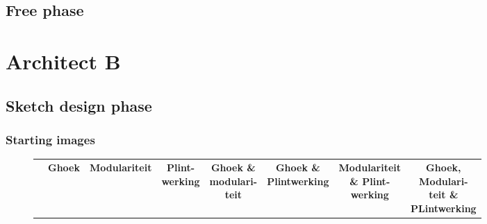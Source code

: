 \subsection{Free phase}

\section{Architect B}
\subsection{Sketch design phase}
\subsubsection{Starting images}
\begin{figure}[H]
  \centering
  {\footnotesize
  \renewcommand{\arraystretch}{1.1}
  \setlength{\tabcolsep}{4pt}
  \begin{tabular}{c c c c c c c c}
    & \textbf{Ghoek} & \textbf{Modulariteit} & \shortstack{\textbf{Plint-}\\\textbf{werking}}
    & \shortstack{\textbf{Ghoek \&}\\ \textbf{modulari-}\\\textbf{teit}} 
    & \shortstack{\textbf{Ghoek \&}\\ \textbf{Plintwerking}} 
    & \shortstack{\textbf{Modulariteit} \\ \textbf{ \& Plint-}\\\textbf{werking}} 
    & \shortstack{\textbf{Ghoek,}\\\textbf{Modulari-}\\\textbf{teit \&}\\\textbf{PLintwerking}} \\


\end{tabular}}
\end{figure}
